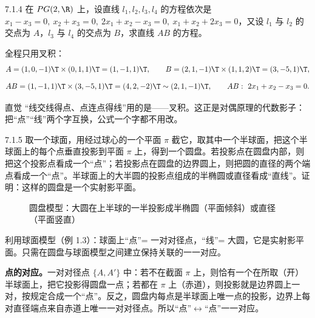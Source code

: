\begin{ex}{7.1.4}
在 $PG(2,\R)$ 上，设直线 $l_1,l_2,l_3,l_4$ 的方程依次是 $x_1-x_3=0,\ x_2+x_3=0,\ 2x_1+x_2-x_3=0,\ x_1+x_2+2x_3=0$，又设 $l_1$ 与 $l_2$ 的交点为 $A$，$l_3$ 与 $l_4$ 的交点为 $B$，求直线 $AB$ 的方程。
\end{ex}
\jie 全程只用叉积：
\[
A=(1,0,-1)\T\times(0,1,1)\T=(1,-1,1)\T,\qquad
B=(2,1,-1)\T\times(1,1,2)\T=(3,-5,1)\T,
\]
\[
AB=(1,-1,1)\T\times(3,-5,1)\T=(4,2,-2)\T\sim(2,1,-1)\T,\qquad AB:\ 2x_1+x_2-x_3=0 .
\]
\begin{intbox}{直觉}
“线交线得点、点连点得线”用的是——叉积。这正是对偶原理的代数影子：把“点”“线”两个字互换，公式一个字都不用改。
\end{intbox}

\begin{ex}{7.1.5}
取一个球面，用经过球心的一个平面 $\pi$ 截它，取其中一个半球面，把这个半球面上的每个点垂直投影到平面 $\pi$ 上，得到一个圆盘。若投影点在圆盘内部，则把这个投影点看成一个“点”；若投影点在圆盘的边界圆上，则把圆的直径的两个端点看成一个“点”。半球面上的大半圆的投影点组成的半椭圆或直径看成“直线”。证明：这样的圆盘是一个实射影平面。
\end{ex}

\begin{figure}[htbp]
\centering
{}
\caption{圆盘模型：大圆在上半球的一半投影成半椭圆（平面倾斜）或直径（平面竖直）}
\end{figure}

\zheng 利用球面模型（例 1.3）：球面上“点”= 一对对径点，“线”= 大圆，它是实射影平面。只需在圆盘与球面模型之间建立保持关联的一一对应。

\textbf{点的对应。}一对对径点 $\{A,A'\}$ 中：若不在截面 $\pi$ 上，则恰有一个在所取（开）半球面上，把它投影得圆盘一点；若都在 $\pi$ 上（赤道），则投影就是边界圆上一对，按规定合成一个“点”。反之，圆盘内每点是半球面上唯一点的投影，边界上每对直径端点来自赤道上唯一一对对径点。所以“点”$\leftrightarrow$“点”一一对应。

